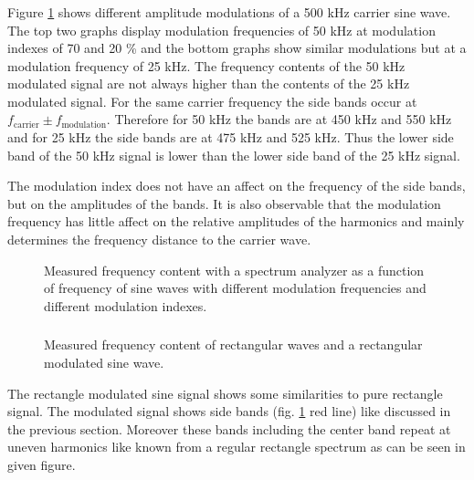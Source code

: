 \documentclass[a4paper,12pt]{article}
\begin{document}
	\subsubsection{}
	
	Figure \ref{fig:444} shows different amplitude modulations of a 500 kHz carrier sine wave. The top two graphs display modulation frequencies of 50 kHz at modulation indexes of 70 and 20 \% and the bottom graphs show similar modulations but at a modulation frequency of 25 kHz.
	The frequency contents of the 50 kHz modulated signal are not always higher than the contents of the 25 kHz modulated signal. For the same carrier frequency the side bands occur at $f_\mathrm{carrier} \pm f_\mathrm{modulation}$. Therefore for 50 kHz the bands are at 450 kHz and 550 kHz and for 25 kHz the side bands are at 475 kHz and 525 kHz. Thus the lower side band of the 50 kHz signal is lower than the lower side band of the 25 kHz signal.
	
	The modulation index does not have an affect on the frequency of the side bands, but on the amplitudes of the bands.
	It is also observable that the modulation frequency has little affect on the relative amplitudes of the harmonics and mainly determines the frequency distance to the carrier wave.
		
	\begin{figure}[H]
		\centering
		
		\caption{Measured frequency content with a spectrum analyzer as a function of frequency of sine waves with different modulation frequencies and different modulation indexes.}
		\label{fig:444}
	\end{figure}
	
	\subsubsection{}
	
	\begin{figure}[H]
		\centering
		
		\caption{Measured frequency content of rectangular waves and a rectangular modulated sine wave.}
		\label{fig:445}
	\end{figure}
	
	The rectangle modulated sine signal shows some similarities to pure rectangle signal. The modulated signal shows side bands (fig. \ref{fig:444} red line) like discussed in the previous section. Moreover these bands including the center band repeat at uneven harmonics like known from a regular rectangle spectrum as can be seen in given figure.
	
\end{document}
